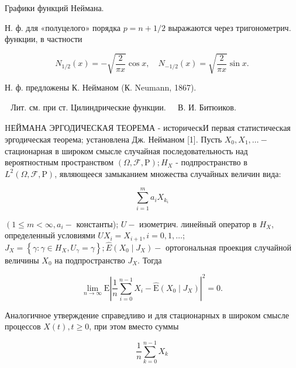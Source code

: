 \documentclass[10pt]{article}
\begin{document}
Графики функций Неймана.



Н. ф. для «полуцелого» порядка $p=n+1 / 2$ выражаются через тригонометрич. функции, в частности



\[

N_{1 / 2}(x)=-\sqrt{\frac{2}{\pi x}} \cos x, \quad N_{-1 / 2}(x)=\sqrt{\frac{2}{\pi x}} \sin x .

\]



Н. ф. предложены К. Нейманом (К. Neumann, 1867).



$\begin{array}{ll}\text { Лит. см. при ст. Цилиндрические функции. } & \text { В. И. Битюиков. }\end{array}$



HЕЙМАНА ЭРГОДИЧЕСКАЯ ТЕОРЕМА - историческИ первая статистическая эргодическая теорема; установлена Дж. Нейманом [1]. Пусть $X_{0}, X_{1}, \ldots-$ стационарная в широком смысле случайная последовательность над вероятностным пространством $(\Omega, \mathscr{F}, \mathrm{P}) ; H_{X}$ - подпространство в $L^{2}(\Omega, \mathscr{F}, \mathrm{P})$, являющееся замыканием множества случайных величин вида:



\[

\sum_{i=1}^{m} a_{i} X_{k_{i}}

\]



$\left(1 \leqslant m<\infty, a_{i}-\right.$ константы); $U-$ изометрич. линейный оператор в $H_{X}$, определенный условиями $U X_{i}=X_{i+1}, i=0,1, \ldots$; $J_{X}=\left\{\gamma: \gamma \in H_{X}, U_{\gamma}=\gamma\right\} ; \hat{E}\left(X_{0} \mid J_{X}\right)-$ ортогональная проекция случайной величины $X_{0}$ на подпространство $J_{X}$. Тогда



\[

\lim _{n \rightarrow \infty} \mathrm{E}\left|\frac{1}{n} \sum_{i=0}^{n-1} X_{i}-\hat{\mathrm{E}}\left(X_{0} \mid J_{X}\right)\right|^{2}=0 .

\]



Аналогичное утверждение справедливо и для стационарных в широком смысле процессов $X(t), t \geqslant 0$, при этом вместо суммы



\[

\frac{1}{n} \sum_{k=0}^{n-1} X_{k}

\]
\end{document}
